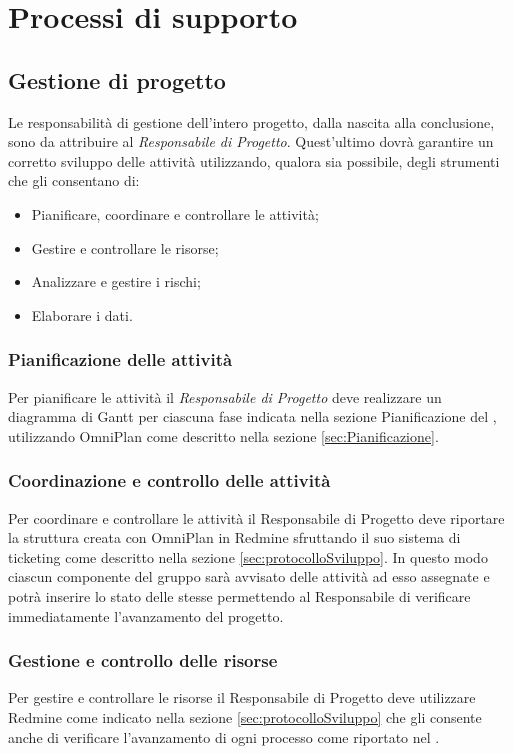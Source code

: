 \section{Processi di supporto}{

\subsection{Gestione di progetto}
Le responsabilità di gestione dell’intero progetto, dalla nascita alla conclusione, sono da
attribuire al \emph{Responsabile di Progetto}.
Quest’ultimo dovrà garantire un corretto sviluppo delle attività utilizzando, qualora sia possibile, degli strumenti che gli consentano di:
\begin{itemize}
\item Pianificare, coordinare e controllare le attività;
\item Gestire e controllare le risorse;
\item Analizzare e gestire i rischi;
\item Elaborare i dati.
\end{itemize}
\subsubsection{Pianificazione delle attività}
Per pianificare le attività il \emph{Responsabile di Progetto} deve realizzare un diagramma di
Gantt  per ciascuna fase indicata nella sezione Pianificazione del \href{run:../../Esterni/\fPianoDiProgetto}{\fEscapePianoDiProgetto} , utilizzando OmniPlan come descritto nella sezione \ref{sec:Pianificazione}.
\subsubsection{Coordinazione e controllo delle attività}
Per coordinare e controllare le attività il Responsabile di Progetto deve riportare la struttura creata con OmniPlan in Redmine sfruttando il suo sistema di ticketing
come descritto nella sezione \ref{sec:protocolloSviluppo}.
In questo modo ciascun componente del gruppo sarà avvisato delle attività ad esso assegnate e potrà inserire lo stato delle stesse permettendo al Responsabile di verificare immediatamente l’avanzamento del progetto.

\subsubsection{Gestione e controllo delle risorse}
Per gestire e controllare le risorse il Responsabile di Progetto deve utilizzare Redmine come indicato nella sezione \ref{sec:protocolloSviluppo} che gli consente anche di verificare l’avanzamento di ogni processo come riportato nel \href{run:../../Esterni/\fPianoDiProgetto}{\fEscapePianoDiProgetto} .
}
